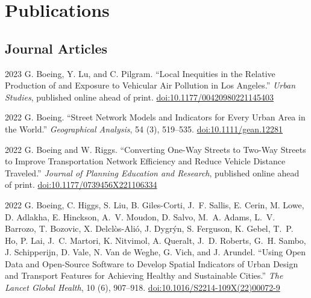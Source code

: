 \documentclass[11pt,letterpaper]{report}
\begin{document}
    \section*{Publications}

    \subsection*{Journal Articles}

    \begin{tablist}


        \item[2023] \tab{}G. Boeing, Y. Lu, and C. Pilgram. \enquote{Local Inequities in the Relative Production of and Exposure to Vehicular Air Pollution in Los Angeles.} \textit{Urban Studies}, published online ahead of print. \href{https://doi.org/10.1177/00420980221145403}{doi:10.1177/00420980221145403}

        \item[2022] \tab{}G. Boeing. \enquote{Street Network Models and Indicators for Every Urban Area in the World.} \textit{Geographical Analysis}, 54 (3), 519--535. \href{https://doi.org/10.1111/gean.12281}{doi:10.1111/gean.12281}

        \item[2022] \tab{}G. Boeing and W. Riggs. \enquote{Converting One-Way Streets to Two-Way Streets to Improve Transportation Network Efficiency and Reduce Vehicle Distance Traveled.} \textit{Journal of Planning Education and Research}, published online ahead of print. \href{https://doi.org/10.1177/0739456X221106334}{doi:10.1177/0739456X221106334}

        \item[2022] \tab{}G. Boeing, C. Higgs, S. Liu, B. Giles-Corti, J.~F. Sallis, E. Cerin, M. Lowe, D. Adlakha, E. Hinckson, A.~V. Moudon, D. Salvo, M.~A. Adams, L.~V. Barrozo, T. Bozovic, X. Delclòs-Alió, J. Dygrýn, S. Ferguson, K. Gebel, T.~P. Ho, P. Lai, J.~C. Martori, K. Nitvimol, A. Queralt, J.~D. Roberts, G.~H. Sambo, J. Schipperijn, D. Vale, N. Van de Weghe, G. Vich, and J. Arundel. \enquote{Using Open Data and Open-Source Software to Develop Spatial Indicators of Urban Design and Transport Features for Achieving Healthy and Sustainable Cities.} \textit{The Lancet Global Health}, 10 (6), 907--918. \href{https://doi.org/10.1016/S2214-109X(22)00072-9}{doi:10.1016/S2214-109X(22)00072-9}


\end{tablist}
\end{document}
